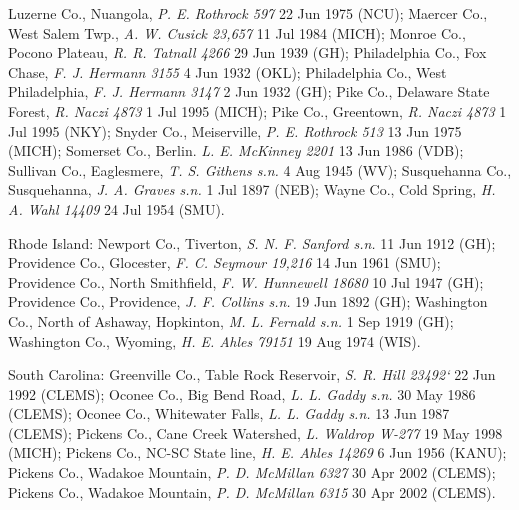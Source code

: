 \documentclass{article}
\begin{document}
Luzerne Co., Nuangola, \textit{P. E. Rothrock 597} 22 Jun 1975 (NCU);
Maercer Co., West Salem Twp., \textit{A. W. Cusick 23,657} 11 Jul 1984 (MICH);
Monroe Co., Pocono Plateau, \textit{R. R. Tatnall 4266} 29 Jun 1939 (GH);
Philadelphia Co., Fox Chase, \textit{F. J. Hermann 3155} 4 Jun 1932 (OKL);
Philadelphia Co., West Philadelphia, \textit{F. J. Hermann 3147} 2 Jun 1932 (GH);
Pike Co., Delaware State Forest, \textit{R. Naczi 4873} 1 Jul 1995 (MICH);
Pike Co., Greentown, \textit{R. Naczi 4873} 1 Jul 1995 (NKY);
Snyder Co., Meiserville, \textit{P. E. Rothrock 513} 13 Jun 1975 (MICH);
Somerset Co., Berlin. \textit{L. E. McKinney 2201} 13 Jun 1986 (VDB);
Sullivan Co., Eaglesmere, \textit{T. S. Githens s.n.} 4 Aug 1945 (WV);
Susquehanna Co., Susquehanna, \textit{J. A. Graves s.n.} 1 Jul 1897 (NEB);
Wayne Co., Cold Spring, \textit{H. A. Wahl 14409} 24 Jul 1954 (SMU).

Rhode Island:
Newport Co., Tiverton, \textit{S. N. F. Sanford s.n.} 11 Jun 1912 (GH);
Providence Co., Glocester, \textit{F. C. Seymour 19,216} 14 Jun 1961 (SMU);
Providence Co., North Smithfield, \textit{F. W. Hunnewell 18680} 10 Jul 1947 (GH);
Providence Co., Providence, \textit{J. F. Collins s.n.} 19 Jun 1892 (GH);
Washington Co., North of Ashaway, Hopkinton, \textit{M. L. Fernald s.n.} 1 Sep 1919 (GH);
Washington Co., Wyoming, \textit{H. E. Ahles 79151} 19 Aug 1974 (WIS).

\begin{sloppypar}
South Carolina:
Greenville Co., Table Rock Reservoir, \textit{S. R. Hill 23492`} 22 Jun 1992 (CLEMS);
Oconee Co., Big Bend Road, \textit{L. L. Gaddy s.n.} 30 May 1986 (CLEMS);
Oconee Co., Whitewater Falls, \textit{L. L. Gaddy s.n.} 13 Jun 1987 (CLEMS);
Pickens Co., Cane Creek Watershed, \textit{L. Waldrop W-277} 19 May 1998 (MICH);
Pickens Co., NC-SC State line, \textit{H. E. Ahles 14269} 6 Jun 1956 (KANU);
Pickens Co., Wadakoe Mountain, \textit{P. D. McMillan 6327} 30 Apr 2002 (CLEMS);
Pickens Co., Wadakoe Mountain, \textit{P. D. McMillan 6315} 30 Apr 2002 (CLEMS).
\end{sloppypar}
\end{document}
